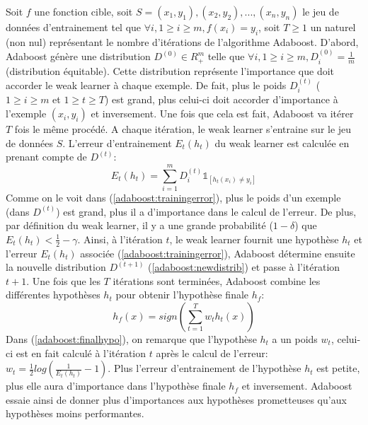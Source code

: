 \documentclass[french]{article}
\theoremstyle{definition}
\theoremstyle{remark}
\begin{document}
Soit $f$ une fonction cible, soit $S=(x_1,y_1),(x_2,y_2),...,(x_n,y_n)$ le jeu de données d'entrainement tel que $\forall i, 1 \geq i \geq m, f(x_i) = y_i$, soit $T \geq 1$ un naturel (non nul) représentant le nombre d'itérations de l'algorithme Adaboost. D'abord, Adaboost génère une distribution $D^{(0)} \in R^m_+$ telle que $\forall i, 1 \geq i \geq m, D^{(0)}_i = \frac{1}{m}$ (distribution équitable). Cette distribution représente l'importance que doit accorder le weak learner à chaque exemple. De fait, plus le poids $D^{(t)}_i$ ($1 \geq i \geq m$ et $1 \geq t \geq T$) est grand, plus celui-ci doit accorder d'importance à l'exemple $(x_i,y_i)$ et inversement. Une fois que cela est fait, Adaboost va itérer $T$ fois le même procédé. A chaque itération, le weak learner s'entraine sur le jeu de données $S$. L'erreur d'entrainement $E_t(h_t)$ du weak learner est calculée en prenant compte de $D^{(t)}$:
\begin{equation}
\label{adaboost:trainingerror}
E_t(h_t) = \sum_{i=1}^m D^{(t)}_i \mathbb{1}_{[h_t(x_i) \neq y_i]}
\end{equation}
Comme on le voit dans (\ref{adaboost:trainingerror}), plus le poids d'un exemple (dans $D^{(t)}$) est grand, plus il a d'importance dans le calcul de l'erreur. De plus, par définition du weak learner, il y a une grande probabilité ($1- \delta$) que $E_t(h_t)< \frac{1}{2} - \gamma$. Ainsi, à l'itération $t$, le weak learner fournit une hypothèse $h_t$ et l'erreur $E_t(h_t)$ associée (\ref{adaboost:trainingerror}), Adaboost détermine ensuite la nouvelle distribution $D^{(t+1)}$ (\ref{adaboost:newdistrib}) et passe à l'itération $t+1$. Une fois que les $T$ itérations sont terminées, Adaboost combine les différentes hypothèses $h_t$ pour obtenir l'hypothèse finale $h_f$:
\begin{equation}
\label{adaboost:finalhypo}
h_f(x) = sign (\sum_{t=1}^T w_t h_t(x))
\end{equation}
Dans (\ref{adaboost:finalhypo}), on remarque que l'hypothèse $h_t$ a un poids $w_t$, celui-ci est en fait calculé à l'itération $t$ après le calcul de l'erreur: $w_t = \frac{1}{2} log(\frac{1}{E_t(h_t)} - 1)$. Plus l'erreur d'entrainement de l'hypothèse $h_t$ est petite, plus elle aura d'importance dans l'hypothèse finale $h_f$ et inversement. Adaboost essaie ainsi de donner plus d'importances aux hypothèses prometteuses qu'aux hypothèses moins performantes.
\end{document}
